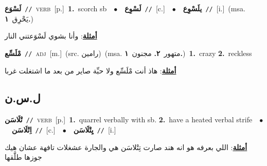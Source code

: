 \documentclass[10pt,a4paper,twoside]{article} %
\begin{document}
\begin{multicols}{2}
{\setlength\topsep{0pt}\textbf{\foreignlanguage{arabic}{لَسْوَع}}\ {\color{gray}\texttt{//}\color{black}}\ \textsc{verb}\ [p.]\ \textbf{1.}~scorch sb\ \ $\bullet$\ \ \setlength\topsep{0pt}\textbf{\foreignlanguage{arabic}{لَسْوِع}}\ {\color{gray}\texttt{//}\color{black}}\ [c.]\ \ $\bullet$\ \ \setlength\topsep{0pt}\textbf{\foreignlanguage{arabic}{يلَسْوِع}}\ {\color{gray}\texttt{//}\color{black}}\ [i.]\ \color{gray}(msa. \foreignlanguage{arabic}{يَحْرِق}~\foreignlanguage{arabic}{\textbf{١.}})\color{black}\  \begin{flushright}\color{gray}\foreignlanguage{arabic}{\textbf{\underline{\foreignlanguage{arabic}{أمثلة}}}: وأنا بشوي لَسْوَعتني النار}\end{flushright}\color{black}} \vspace{2mm}

{\setlength\topsep{0pt}\textbf{\foreignlanguage{arabic}{مْلَسِّع}}\ {\color{gray}\texttt{//}\color{black}}\ \textsc{adj}\ [m.]\ (src. \color{gray}\foreignlanguage{arabic}{رامين}\color{black})\ \color{gray}(msa. \foreignlanguage{arabic}{متهور}~\foreignlanguage{arabic}{\textbf{٢.}}  \foreignlanguage{arabic}{مجنون}~\foreignlanguage{arabic}{\textbf{١.}})\color{black}\ \textbf{1.}~crazy  \textbf{2.}~reckless\  \begin{flushright}\color{gray}\foreignlanguage{arabic}{\textbf{\underline{\foreignlanguage{arabic}{أمثلة}}}: هاذ أنت مْلَسِّع ولا حبِّة صاير من بعد ما اشتغلت غربا}\end{flushright}\color{black}} \vspace{2mm}

\vspace{-3mm}
\subsection*{\color{blue}\foreignlanguage{arabic}{ل.س.ن}\color{blue}{}} 

{\setlength\topsep{0pt}\textbf{\foreignlanguage{arabic}{تْلَاسَن}}\ {\color{gray}\texttt{//}\color{black}}\ \textsc{verb}\ [p.]\ \textbf{1.}~quarrel verbally with sb.  \textbf{2.}~have a heated verbal strife\ \ $\bullet$\ \ \setlength\topsep{0pt}\textbf{\foreignlanguage{arabic}{اِتْلَاسَن}}\ {\color{gray}\texttt{//}\color{black}}\ [c.]\ \ $\bullet$\ \ \setlength\topsep{0pt}\textbf{\foreignlanguage{arabic}{يِتْلَاسَن}}\ {\color{gray}\texttt{//}\color{black}}\ [i.]\  \begin{flushright}\color{gray}\foreignlanguage{arabic}{\textbf{\underline{\foreignlanguage{arabic}{أمثلة}}}: اللي بعرفه هو انه هند صارت تِتْلاسَن هي والجارة عشغلات تافهة عشان هيك جوزها طلَّقها}\end{flushright}\color{black}} \vspace{2mm}


\end{multicols}
\end{document}
